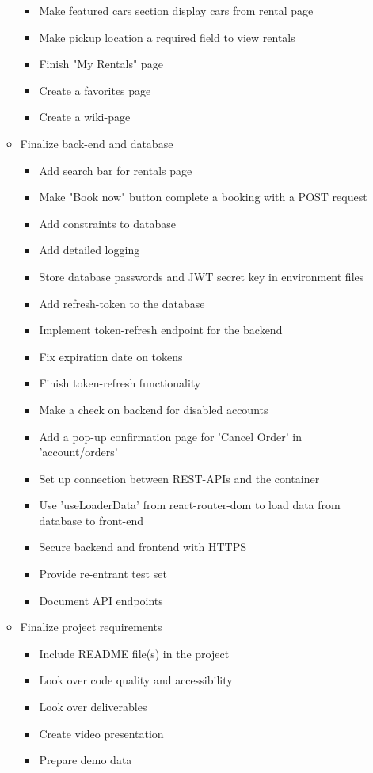 \documentclass[a4paper,12pt]{article}
\begin{document}
\begin{itemize}
\begin{itemize}
\begin{itemize}
            \item Make featured cars section display cars from rental page
            \item Make pickup location a required field to view rentals
            \item Finish "My Rentals" page
            \item Create a favorites page
            \item Create a wiki-page
        \end{itemize}
        \item Finalize back-end and database
        \begin{itemize}
            \item Add search bar for rentals page
            \item Make "Book now" button complete a booking with a POST request
            \item Add constraints to database
            \item Add detailed logging
            \item Store database passwords and JWT secret key in environment files
            \item Add refresh-token to the database
            \item Implement token-refresh endpoint for the backend
            \item Fix expiration date on tokens
            \item Finish token-refresh functionality
            \item Make a check on backend for disabled accounts
            \item Add a pop-up confirmation page for 'Cancel Order' in 'account/orders'
            \item Set up connection between REST-APIs and the container
            \item Use 'useLoaderData' from react-router-dom to load data from database to front-end
            \item Secure backend and frontend with HTTPS
            \item Provide re-entrant test set
            \item Document API endpoints
        \end{itemize}
        \item Finalize project requirements
        \begin{itemize}
            \item        Include README file(s) in the project
            \item Look over code quality and accessibility
            \item Look over deliverables
            \item Create video presentation
            \item Prepare demo data
        \end{itemize}

    \end{itemize}
\end{itemize}
\end{document}
